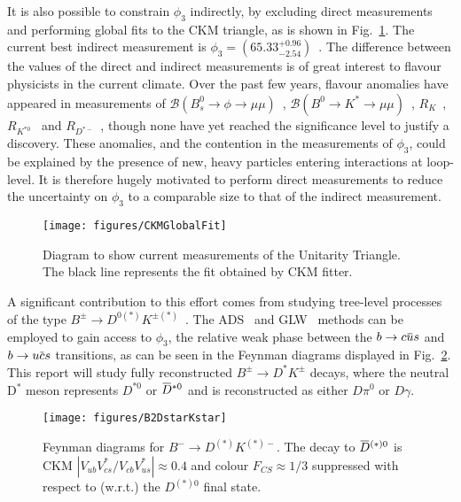 \documentclass[oneside,12pt]{article}
\newcommand{\overbar}[1]{\mkern 1.5mu\overline{\mkern-1.5mu#1\mkern-1.5mu}\mkern 1.5mu}
\begin{document}
It is also possible to constrain $\phi_3$ indirectly, by excluding direct
measurements and performing global fits to the CKM triangle, as is shown in
Fig.~\ref{fig:CKMGlobalFit}. The current best indirect measurement is
$\phi_3=(65.33^{+0.96}_{-2.54})$\degree~\cite{website:CKMFitter}. The difference
between the values of the direct and indirect measurements is of great interest
to flavour physicists in the current climate. Over the past few years, flavour
anomalies have appeared in measurements of $\mathcal{B} (B^{0}_{s}\rightarrow
\phi \rightarrow \mu \mu)$~\cite{B2phimumu}, $\mathcal{B} (B^{0}\rightarrow
K^{*}\rightarrow \mu \mu)$~\cite{B2Kstmumu}, $R_{K}$~\cite{Rk},
$R_{K^{*0}}$~\cite{Rkst} and $R_{D^{*-}}$~\cite{RDst}, though none have yet
reached the significance level to justify a discovery. These anomalies, and the
contention in the measurements of $\phi_3$, could be explained by the presence
of new, heavy particles entering interactions at loop-level. It is therefore
hugely motivated to perform direct measurements to reduce the uncertainty on
$\phi_{3}$ to a comparable size to that of the indirect measurement.
\begin{figure}[H]
  \centering
  \texttt{[image: figures/CKMGlobalFit]}
  \caption{\small{Diagram to show current measurements of the Unitarity Triangle. The black line represents the fit obtained by CKM fitter.}}
  \label{fig:CKMGlobalFit}
  \vspace{-10pt}
\end{figure}
\noindent A significant contribution to this effort comes from studying
tree-level processes of the type $B^{\pm}\rightarrow D^{0(*)}K^{\pm
(*)}$~\cite{B2DKD2hh, DalitzRun1, DalitzRun2, B2DKstD2hh, B2DstKD2hh}. The
ADS~\cite{ADSRef} and GLW~\cite{GLWRef} methods can be employed to gain access
to $\phi_3$, the relative weak phase between the $b\rightarrow c\overbar{u}s$
and $b\rightarrow u\overbar{c}s$ transitions, as can be seen in the Feynman
diagrams displayed in Fig.~\ref{fig:B2DstarKstar}. This report will study fully
reconstructed $B^{\pm}\rightarrow D^{*}K^{\pm}$ decays, where the neutral
D$^{*}$ meson represents $D^{*0}$ or $\overbar{D}^{*0}$ and is reconstructed as
either $D\pi^{0}$ or $D\gamma$. 
\begin{figure}[H]
  \centering \texttt{[image: figures/B2DstarKstar]}
  \caption{\small{Feynman diagrams for ${B}^{-}\rightarrow{D}^{(*)}{K}^{(*)-}$}.
  The decay to $\overbar{{D}}^{(*)0}$ is CKM
  $|V_{ub}V^{*}_{cs}/V_{cb}V^{*}_{us}|\approx0.4$ and colour
  ${F}_{CS}\approx1/3$ suppressed with respect to (w.r.t.) the ${D}^{(*)0}$
  final state.} \label{fig:B2DstarKstar} \vspace{-10pt}
\end{figure}
\end{document}
